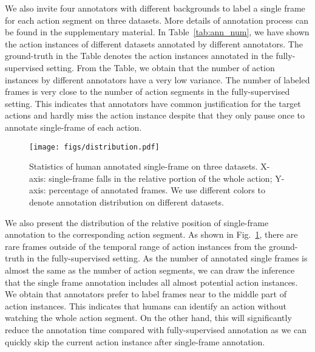 \documentclass[runningheads]{llncs}
\begin{document}
	
	
	We also invite four annotators with different backgrounds to label a single frame for each action segment on three datasets. More details of annotation process can be found in the supplementary material. In Table~\ref{tab:ann_num}, we have shown the action instances of different datasets annotated by different annotators. The ground-truth in the Table denotes the action instances annotated in the fully-supervised setting. From the Table, we obtain that the number of action instances by different annotators have a very low variance. The number of labeled frames is very close to the number of action segments in the fully-supervised setting. This indicates that annotators have common justification for the target actions and hardly miss the action instance despite that they only pause once to annotate single-frame of each action.
	
	
	\begin{figure}[t]
		\centering
		\texttt{[image: figs/distribution.pdf]}
		\caption{Statistics of human annotated single-frame on three datasets. X-axis: single-frame falls in the relative portion of the whole action; Y-axis: percentage of annotated frames. We use different colors to denote annotation distribution on different datasets. 
		}
		\label{fig:ann_distribution}
	\end{figure}
	
	We also present the distribution of the relative position of single-frame annotation to the corresponding action segment.
	As shown in Fig.~\ref{fig:ann_distribution},  there are rare frames outside of the temporal range of action instances from the ground-truth in the fully-supervised setting. 
	As the number of annotated single frames is almost the same as the number of action segments, we can draw the inference that the single frame annotation includes all almost potential action instances.  
	We obtain that annotators prefer to label frames near to the middle part of action instances. 
	This indicates that humans can identify an action without watching the whole action segment. On the other hand, this will significantly reduce the annotation time compared with fully-supervised annotation as we can quickly skip the current action instance after single-frame annotation.  
	
	
	
	
	
	
	
	
\end{document}

